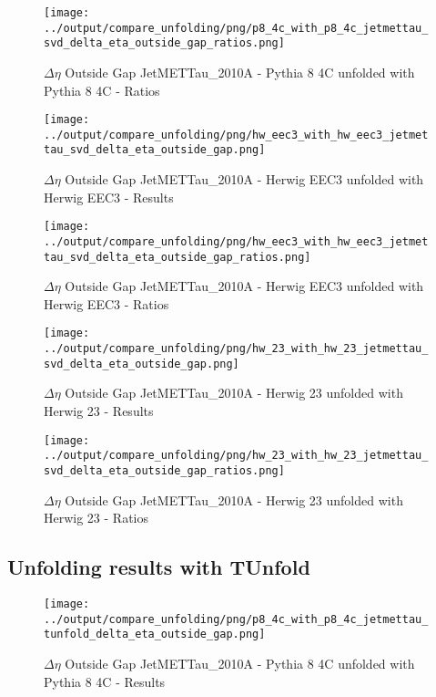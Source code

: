 \documentclass[11pt]{book}
\begin{document}
\begin{figure}[ht]
\centering
\texttt{[image: ../output/compare\_unfolding/png/p8\_4c\_with\_p8\_4c\_jetmettau\_svd\_delta\_eta\_outside\_gap\_ratios.png]}
\caption{$\Delta\eta$ Outside Gap JetMETTau\_2010A - Pythia 8 4C unfolded with Pythia 8 4C - Ratios}
\label{p8_p8_jetmettau_svd_delta_eta_outside_gap_b}
\end{figure}

\begin{figure}[ht]
\centering
\texttt{[image: ../output/compare\_unfolding/png/hw\_eec3\_with\_hw\_eec3\_jetmettau\_svd\_delta\_eta\_outside\_gap.png]}
\caption{$\Delta\eta$ Outside Gap JetMETTau\_2010A - Herwig EEC3 unfolded with Herwig EEC3 - Results}
\label{hw_eec3_hw_eec3_jetmettau_svd_delta_eta_outside_gap_a}
\end{figure}

\begin{figure}[ht]
\centering
\texttt{[image: ../output/compare\_unfolding/png/hw\_eec3\_with\_hw\_eec3\_jetmettau\_svd\_delta\_eta\_outside\_gap\_ratios.png]}
\caption{$\Delta\eta$ Outside Gap JetMETTau\_2010A - Herwig EEC3 unfolded with Herwig EEC3 - Ratios}
\label{hw_eec3_hw_eec3_jetmettau_svd_delta_eta_outside_gap_b}
\end{figure}

\begin{figure}[ht]
\centering
\texttt{[image: ../output/compare\_unfolding/png/hw\_23\_with\_hw\_23\_jetmettau\_svd\_delta\_eta\_outside\_gap.png]}
\caption{$\Delta\eta$ Outside Gap JetMETTau\_2010A - Herwig 23 unfolded with Herwig 23 - Results}
\label{hw_23_hw_23_jetmettau_svd_delta_eta_outside_gap_a}
\end{figure}

\begin{figure}[ht]
\centering
\texttt{[image: ../output/compare\_unfolding/png/hw\_23\_with\_hw\_23\_jetmettau\_svd\_delta\_eta\_outside\_gap\_ratios.png]}
\caption{$\Delta\eta$ Outside Gap JetMETTau\_2010A - Herwig 23 unfolded with Herwig 23 - Ratios}
\label{hw_23_hw_23_jetmettau_svd_delta_eta_outside_gap_b}
\end{figure}


\clearpage
\subsection{Unfolding results with TUnfold}

\begin{figure}[ht]
\centering
\texttt{[image: ../output/compare\_unfolding/png/p8\_4c\_with\_p8\_4c\_jetmettau\_tunfold\_delta\_eta\_outside\_gap.png]}
\caption{$\Delta\eta$ Outside Gap JetMETTau\_2010A - Pythia 8 4C unfolded with Pythia 8 4C - Results}
\label{p8_p8_jetmettau_tunfold_delta_eta_outside_gap_a}
\end{figure}
\end{document}
